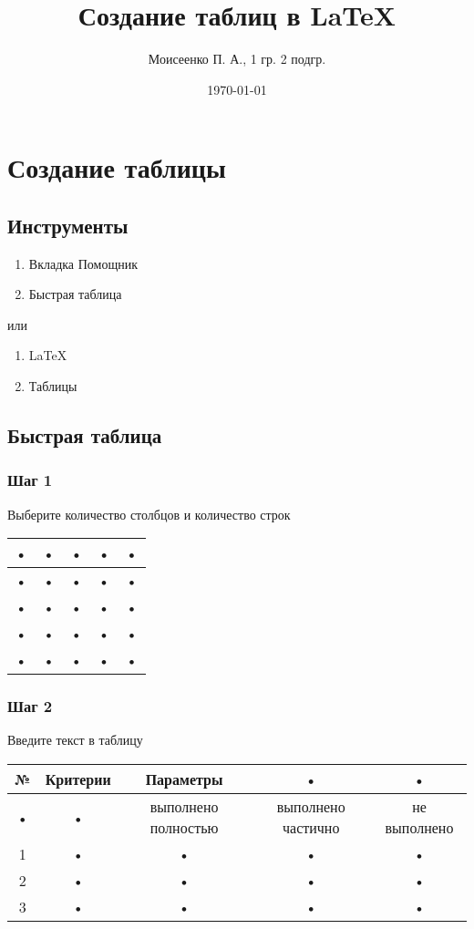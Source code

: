 \documentclass[a4paper,12pt]{article} %
\author{Моисеенко П. А., 1 гр. 2 подгр.}
\title{Создание таблиц в \LaTeX}
\date{\today}
\begin{document}
\maketitle
\newpage
\section{Создание таблицы}
\subsection{Инструменты}
\begin{enumerate}
\item Вкладка Помощник
\item Быстрая таблица
\end{enumerate}

или

\begin{enumerate}
\item LaTeX
\item Таблицы
\end{enumerate}

\subsection{Быстрая таблица}
\subsubsection{Шаг 1}
Выберите количество столбцов и количество строк\\
\begin{tabular}{|c|c|c|c|c|}
\hline
• & • & • & • & • \\
\hline
• & • & • & • & • \\
\hline
• & • & • & • & • \\
\hline
• & • & • & • & • \\
\hline
• & • & • & • & • \\
\hline
\end{tabular}

\subsubsection{Шаг 2}
Введите текст в таблицу\\
\begin{tabular}{|c|c|c|c|c|}
\hline
№ & Критерии & Параметры & • & • \\
\hline
• & • & выполнено полностью & выполнено частично & не выполнено \\
\hline
1 & • & • & • & • \\
\hline
2 & • & • & • & • \\
\hline
3 & • & • & • & • \\
\hline
\end{tabular}
\end{document}
